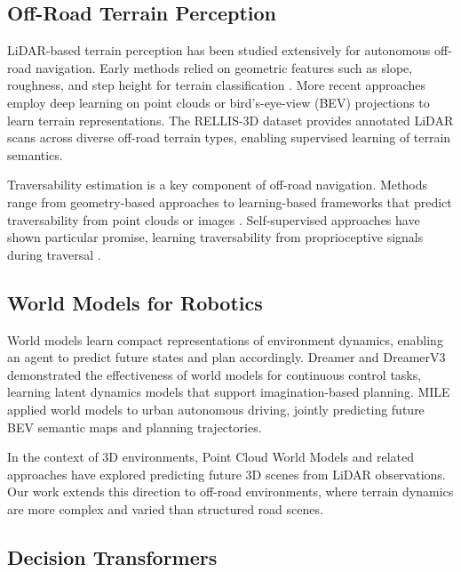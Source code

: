 \documentclass[journal]{IEEEtran}
\begin{document}
\subsection{Off-Road Terrain Perception}

LiDAR-based terrain perception has been studied extensively for autonomous off-road navigation. Early methods relied on geometric features such as slope, roughness, and step height for terrain classification \cite{papadakis2013}. More recent approaches employ deep learning on point clouds \cite{qi2017, qi2017b} or bird's-eye-view (BEV) projections \cite{zhou2018, lang2019} to learn terrain representations. The RELLIS-3D dataset \cite{jiang2021} provides annotated LiDAR scans across diverse off-road terrain types, enabling supervised learning of terrain semantics.

Traversability estimation is a key component of off-road navigation. Methods range from geometry-based approaches \cite{sock2016} to learning-based frameworks that predict traversability from point clouds or images \cite{wellhausen2019, frey2023}. Self-supervised approaches have shown particular promise, learning traversability from proprioceptive signals during traversal \cite{castro2023, frey2024}.

\subsection{World Models for Robotics}

World models learn compact representations of environment dynamics, enabling an agent to predict future states and plan accordingly. Dreamer \cite{hafner2020} and DreamerV3 \cite{hafner2023} demonstrated the effectiveness of world models for continuous control tasks, learning latent dynamics models that support imagination-based planning. MILE \cite{hu2022} applied world models to urban autonomous driving, jointly predicting future BEV semantic maps and planning trajectories.

In the context of 3D environments, Point Cloud World Models \cite{yang2023} and related approaches have explored predicting future 3D scenes from LiDAR observations. Our work extends this direction to off-road environments, where terrain dynamics are more complex and varied than structured road scenes.

\subsection{Decision Transformers}
\end{document}
